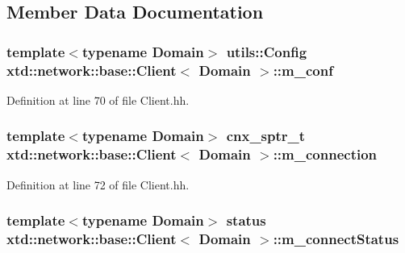 \subsection{Member Data Documentation}
\hypertarget{classxtd_1_1network_1_1base_1_1Client_addb0f7fb40585d3db038b16f11e466cd}{
\subsubsection[{m\-\_\-conf}]{\setlength{\rightskip}{0pt plus 5cm}template$<$typename Domain$>$ {\bf utils\-::\-Config} {\bf xtd\-::network\-::base\-::\-Client}$<$ Domain $>$\-::m\-\_\-conf\hspace{0.3cm}{\ttfamily [protected]}}}\label{classxtd_1_1network_1_1base_1_1Client_addb0f7fb40585d3db038b16f11e466cd}


Definition at line 70 of file Client.\-hh.

\hypertarget{classxtd_1_1network_1_1base_1_1Client_a9293a756af76e066790a1f389dbedb77}{
\subsubsection[{m\-\_\-connection}]{\setlength{\rightskip}{0pt plus 5cm}template$<$typename Domain$>$ {\bf cnx\-\_\-sptr\-\_\-t} {\bf xtd\-::network\-::base\-::\-Client}$<$ Domain $>$\-::m\-\_\-connection\hspace{0.3cm}{\ttfamily [protected]}}}\label{classxtd_1_1network_1_1base_1_1Client_a9293a756af76e066790a1f389dbedb77}


Definition at line 72 of file Client.\-hh.

\hypertarget{classxtd_1_1network_1_1base_1_1Client_a99e6d675c7617cd6d8e94793d8af4871}{
\subsubsection[{m\-\_\-connect\-Status}]{\setlength{\rightskip}{0pt plus 5cm}template$<$typename Domain$>$ status {\bf xtd\-::network\-::base\-::\-Client}$<$ Domain $>$\-::m\-\_\-connect\-Status\hspace{0.3cm}{\ttfamily [protected]}}}\label{classxtd_1_1network_1_1base_1_1Client_a99e6d675c7617cd6d8e94793d8af4871}


